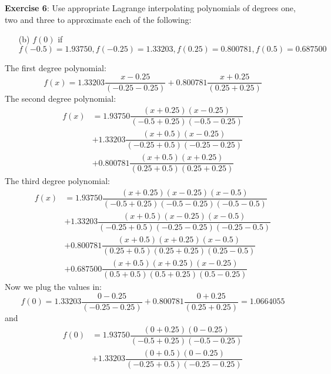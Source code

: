\documentclass{article}
\begin{document}
\textbf{Exercise 6}: Use appropriate Lagrange interpolating polynomials of degrees one, two and three to approximate each of the following:
    \begin{itemize}
        \item [(b)] $f(0)$ if $f(-0.5) = 1.93750, f(-0.25) = 1.33203, f(0.25) = 0.800781, f(0.5) = 0.687500$ 
    \end{itemize}
    \begin{answer}
        The first degree polynomial:
            \begin{equation*}
                f(x) = 1.33203 \dfrac{x - 0.25}{(-0.25 - 0.25)} + 0.800781 \dfrac{x + 0.25}{(0.25 + 0.25)}
            \end{equation*}
        The second degree polynomial:
            \begin{align*}
                f(x) &= 1.93750 \dfrac{(x + 0.25)(x - 0.25)}{(-0.5 + 0.25)(-0.5 - 0.25)} \\ 
                     &+ 1.33203 \dfrac{(x + 0.5)(x - 0.25)}{(-0.25 + 0.5)(-0.25 - 0.25)} \\ 
                     &+ 0.800781 \dfrac{(x + 0.5)(x + 0.25)}{(0.25 + 0.5)(0.25 + 0.25)}
            \end{align*}
        The third degree polynomial:
            \begin{align*}
                f(x) &= 1.93750 \dfrac{(x + 0.25)(x - 0.25)(x - 0.5)}{(-0.5 + 0.25)(-0.5 - 0.25)(-0.5 - 0.5)} \\ 
                     &+ 1.33203 \dfrac{(x + 0.5)(x - 0.25)(x - 0.5)}{(-0.25 + 0.5)(-0.25 - 0.25)(-0.25 - 0.5)} \\ 
                     &+ 0.800781 \dfrac{(x + 0.5)(x + 0.25)(x - 0.5)}{(0.25 + 0.5)(0.25 + 0.25)(0.25 - 0.5)} \\
                     &+ 0.687500 \dfrac{(x + 0.5)(x + 0.25)(x - 0.25)}{(0.5 + 0.5)(0.5 + 0.25)(0.5 - 0.25)}
            \end{align*}
        Now we plug the values in:
            \begin{equation*}
                f(0) = 1.33203 \dfrac{0 - 0.25}{(-0.25 - 0.25)} + 0.800781 \dfrac{0 + 0.25}{(0.25 + 0.25)} = 1.0664055
            \end{equation*}
        and
            \begin{align*}
                f(0) &= 1.93750 \dfrac{(0 + 0.25)(0 - 0.25)}{(-0.5 + 0.25)(-0.5 - 0.25)} \\ 
                     &+ 1.33203 \dfrac{(0 + 0.5)(0 - 0.25)}{(-0.25 + 0.5)(-0.25 - 0.25)} \\ 

\end{align*}
\end{answer}
\end{document}
